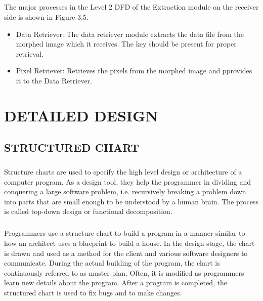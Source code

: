 \documentclass[12pt]{report}
\begin{document}
\paragraph{}The major processes in the Level 2 DFD of the Extraction module on the receiver side is shown in Figure 3.5. 
\begin{itemize}
\item Data Retriever: The data retriever module extracts the data file from the morphed image which it receives. The key should be present for proper retrieval.
\item Pixel Retriever: Retrieves the pixels from the morphed image and pprovides it to the Data Retriever.
\end{itemize}
\pagebreak

\chapter{DETAILED DESIGN}
\pagestyle{fancy}
\chead{}
\rfoot{\small{\thepage}}
\renewcommand{\headrulewidth}{0.4pt}
\renewcommand{\footrulewidth}{0.4pt}
\section{STRUCTURED CHART}
\paragraph{}Structure charts are used to specify the high level design or architecture of a computer program. As a design tool, they help the programmer in dividing and conquering a large software problem, i.e. recursively breaking a problem down into parts that are small enough to be understood by a human brain. The process is called top-down design or functional decomposition. 
\paragraph{}Programmers use a structure chart to build a program in a manner similar to how an architect uses a blueprint to build a house. In the design stage, the chart is drawn and used as a method for the client and various software designers to communicate. During the actual building of the program, the chart is continuously referred to as master plan. Often, it is modified as programmers learn new details about the program. After a program is completed, the structured chart is used to fix bugs and to make changes.
\end{document}
